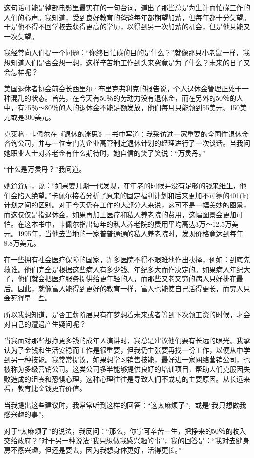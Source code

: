 这句话可能是整部电影里最实在的一句台词，道出了那些总是为生计而忙碌工作的人们的心声。我知道，受到良好教育的爸爸每年都期望加薪，但每年都十分失望。于是他不得不回学校去获得更高的学历，以得到另一次加薪的机会，但是他只能又一次失望。

我经常向人们提一个问题：“你终日忙碌的目的是什么？”就像那只小老鼠一样，我想知道人们是否会想一想，这样辛苦地工作到头来究竟是为了什么？未来的日子又会怎样呢？

美国退休者协会前会长西里尔·布里克弗利克的报告说，个人退休金管理正处于一种混乱的状态。首先，在今天有50％的劳动力没有退休金，而在另外的50％的人中，有75％～80％的人的退休金不能足额发放，他们每月只能领到55美元、150美元或是300美元。

克莱格·卡佩尔在《退休的迷思》一书中写道：我采访过一家重要的全国性退休金咨询公司，并与一位专门为企业高管制定退休计划的经理进行了一次谈话。当我问她职业人士对养老金有什么期待时，她自信的笑了笑说：“万灵丹。”

“什么是万灵丹？”我问道。

她耸耸肩，说：“如果婴儿潮一代发现，在年老的时候并没有足够的钱来维生，他们会陷入绝望。”卡佩尔接着分析了原来的固定福利计划和后来更加不可靠的401(k)计划之间的区别。对于今天仍在工作的大部分人来说，这可不是一幅美妙的图景，而这仅仅是指退休金，如果再加上医疗和私人养老院的费用，这幅图景会更加可怕。在这本书中，卡佩尔指出每年的私人养老院的费用平均高达3万～12.5万美元。1995年，当他去当地的一家普普通通的私人养老院时，发现价格竟达到每年8.8万美元。

在一些拥有社会医疗保障的国家，许多医院不得不艰难地作出抉择，例如：到底先救谁。他们完全是根据这些病人有多少钱、年纪多大而作决定的。如果病人年纪大了，他们就会把医疗服务提供给更年轻的人，而那些又老又穷的病人只好排在最后。因此，就像富人能得到更好的教育一样，富人也能使自己活得更长，而穷人只会死得早一些。

所以我想知道，是否工薪阶层只有在梦想着未来或者等到下次领工资的时候，才会对自己的遭遇产生疑问呢？

当我面对那些想挣更多钱的成年人演讲时，我总是建议他们要有长远的眼光。我承认为了金钱和生活安稳而工作是很重要，但我仍主张要再找一份工作，以便从中学到另一种技能。我常常提议，如果想学习销售技能，最好进一家网络营销公司，也被称为多级营销公司。这类公司多半能够提供良好的培训项目，帮助人们克服因失败造成的沮丧和恐惧心理，这种心理往往是导致人们不成功的主要原因。从长远来看，教育比金钱更有价值。

当我提出这些建议时，我常常听到这样的回答：“这太麻烦了”，或是“我只想做我感兴趣的事”。

对于“太麻烦了”的说法，我反问：“那么，你宁可辛苦一生，把挣来的50％的收入交给政府？”对于另一种说法“我只想做我感兴趣的事”，我的回答是：“我对去健身房不感兴趣，但还是要去，因为我想身体更好，活得更长。”

